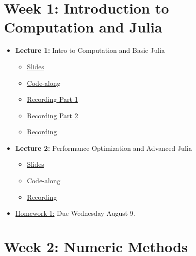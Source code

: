 \documentclass[
]{book}
\providecommand{\tightlist}{%
  \setlength{\itemsep}{0pt}\setlength{\parskip}{0pt}}
\begin{document}
\hypertarget{week-1-introduction-to-computation-and-julia-1}{%
\section{Week 1: Introduction to Computation and Julia}\label{week-1-introduction-to-computation-and-julia-1}}

\begin{itemize}
\tightlist
\item
  \textbf{Lecture 1:} Intro to Computation and Basic Julia

  \begin{itemize}
  \item
    \href{https://kevinghunt.github.io/ComputationCamp/lectures/Lecture1.html}{Slides}
  \item
    \href{https://kevinghunt.github.io/ComputationCamp/codealongs/CodeAlong1.jl}{Code-along}
  \item
    \href{https://uwmadison.zoom.us/rec/share/YbH5nwK8MFfdrG_79ab21fIChvq_GLK2G0cj1PuRpy29LgDW2ddl46KoGUvMzWoz.uN0dl820cFXMQ54_}{Recording Part 1}
  \item
    \href{https://uwmadison.zoom.us/rec/share/grQK03ljFWrQB5hBKKgoAVy9BuR5hg85PgyVvQJrXqJ5olG1fCe9vh336wh_L_yH.8-wkiBg4GIsDT3eC}{Recording Part 2}
  \item
    \href{-\%20https://uwmadison.zoom.us/rec/share/ANmR1Qr-iDoAxMOItHY9zgQk41_bbABcPN4eD3mVE5OVLvhzcXr80yBSEjEi8Dc.V7Hy_3yeHQm84srl}{Recording}
  \end{itemize}
\item
  \textbf{Lecture 2:} Performance Optimization and Advanced Julia

  \begin{itemize}
  \tightlist
  \item
    \href{https://kevinghunt.github.io/ComputationCamp/lectures/Lecture2.html}{Slides}
  \item
    \href{https://kevinghunt.github.io/ComputationCamp/codealongs/CodeAlong2.jl}{Code-along}
  \item
    \href{https://uwmadison.zoom.us/rec/share/ANmR1Qr-iDoAxMOItHY9zgQk41_bbABcPN4eD3mVE5OVLvhzcXr80yBSEjEi8Dc.V7Hy_3yeHQm84srl}{Recording}
  \end{itemize}
\item
  \href{https://kevinghunt.github.io/ComputationCamp/homeworks/homework1.html}{Homework 1:} Due Wednesday August 9.
\end{itemize}

\hypertarget{week-2-numeric-methods-1}{%
\section{Week 2: Numeric Methods}\label{week-2-numeric-methods-1}}
\end{document}
